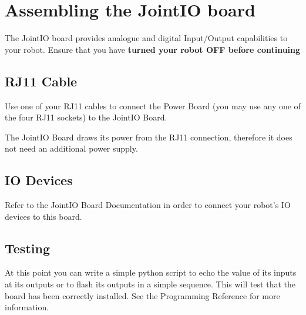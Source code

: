 \section{Assembling the JointIO board}
The JointIO board provides analogue and digital Input/Output capabilities to your robot. Ensure that you have {\bf turned your robot OFF before continuing}

\subsection{RJ11 Cable}
Use one of your RJ11 cables to connect the Power Board (you may use any one of the four RJ11 sockets) to the JointIO Board.

The JointIO Board draws its power from the RJ11 connection, therefore it does not need an additional power supply.

\subsection{IO Devices}
Refer to the JointIO Board Documentation in order to connect your robot's IO devices to this board.

\subsection{Testing}
At this point you can write a simple python script to echo the value of its inputs at its outputs or to flash its outputs in a simple sequence. This will test that the board has been correctly installed. See the Programming Reference for more information.


 

